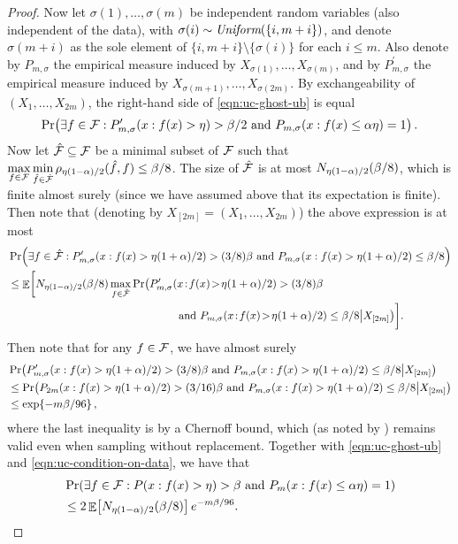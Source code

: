 \documentclass[12pt,a4paper,oneside,onecolumn]{book}
\begin{document}
\begin{proof}
Now let $\sigma(1),\ldots,\sigma(m)$ be independent random variables (also independent of the data), with $\sigma(i) \sim \emph{Uniform}(\{i,m+i\})$,
and denote $\sigma(m+i)$ as the sole element of $\{i,m+i\} \setminus \{\sigma(i)\}$ for each $i \leq m$.
Also denote by $P_{m,\sigma}$ the empirical measure induced by $X_{\sigma(1)},\ldots,X_{\sigma(m)}$, 
and by $P_{m,\sigma}^{\prime}$ the empirical measure induced by $X_{\sigma(m+1)},\ldots,X_{\sigma(2m)}$.
By exchangeability of $(X_{1},\ldots,X_{2m})$, the right-hand side of \eqref{eqn:uc-ghost-ub} is equal 
\begin{equation*}
\Pr\!\left( \exists f \in \mathcal{F} : P_{m,\sigma}^{\prime}( x : f(x) > \eta ) > \beta/2 \text{ and } P_{m,\sigma}( x : f(x) \leq \alpha \eta ) = 1 \right).
\end{equation*}
Now let $\hat{\mathcal{F}} \subseteq \mathcal{F}$ be a minimal subset of $\mathcal{F}$ such that 
$\max\limits_{f \in \mathcal{F}} \min\limits_{\hat{f} \in \hat{\mathcal{F}}} \rho_{\eta (1-\alpha)/2}(\hat{f},f) \leq \beta/8$.
The size of $\hat{\mathcal{F}}$ is at most $N_{\eta(1-\alpha)/2}(\beta/8)$, which is finite almost surely (since we have assumed above that its expectation is finite). 
Then note that (denoting by $X_{[2m]} = (X_{1},\ldots,X_{2m})$) the above expression is at most \small{
\begin{align}
& \Pr\!\left( \exists f \in \hat{\F} : P_{m,\sigma}^{\prime}( x : f(x) > \dev (1+\alpha)/2 ) > (3/8)\beta \text{ and } P_{m,\sigma}( x : f(x) > \dev (1+\alpha)/2 ) \leq \beta/8 \right) \notag 
\\ & \leq \E\!\left[ N_{\dev (1-\alpha)/2}(\beta/8) \max_{f \in \hat{\F}} \Pr\!\left( P_{m,\sigma}^{\prime}( x \!:\! f(x) \!>\! \dev (1+\alpha)/2 ) > (3/8)\beta \right.\right. \notag
\\ & {\hskip 4.5cm} \left. \phantom{\max_{f \in \hat{\F}}} \left. \text{ and } 
P_{m,\sigma}( x \!:\! f(x) \!>\! \dev (1+\alpha)/2 ) \leq \beta/8 \middle| X_{[2m]} \right) \right]\!. \label{eqn:uc-condition-on-data}
\end{align}
}
Then note that for any $f \in \mathcal{F}$, we have almost surely 
\begin{align*}
& \Pr\!\left( P_{m,\sigma}^{\prime}( x : f(x) > \eta (1+\alpha)/2 ) > (3/8)\beta \text{ and } P_{m,\sigma}( x : f(x) > \eta (1+\alpha)/2 ) \leq \beta/8 \middle| X_{[2m]} \right)
\\ & \leq \Pr\!\left( P_{2m}( x : f(x) > \eta (1+\alpha)/2 ) > (3/16) \beta \text{ and } P_{m,\sigma}( x : f(x) > \eta (1+\alpha)/2 ) \leq \beta/8 \middle| X_{[2m]} \right)
\\ & \leq \exp\!\left\{ - m \beta / 96 \right\},
\end{align*}
where the last inequality is by a Chernoff bound, which (as noted by \citet*{hoeffding}) remains valid even when sampling without replacement.
Together with \eqref{eqn:uc-ghost-ub} and \eqref{eqn:uc-condition-on-data}, we have that
\begin{align*}
& \Pr\!\left( \exists f \in \mathcal{F} : P( x : f(x) > \eta ) > \beta \text{ and } P_{m}( x : f(x) \leq \alpha \eta ) =1 \right) 
\\ & \leq 2 \mathop{\mathbb{E}}\!\left[ N_{\eta (1-\alpha)/2}(\beta/8) \right] e^{- m \beta / 96}.
\end{align*}
\end{proof}
\end{document}
